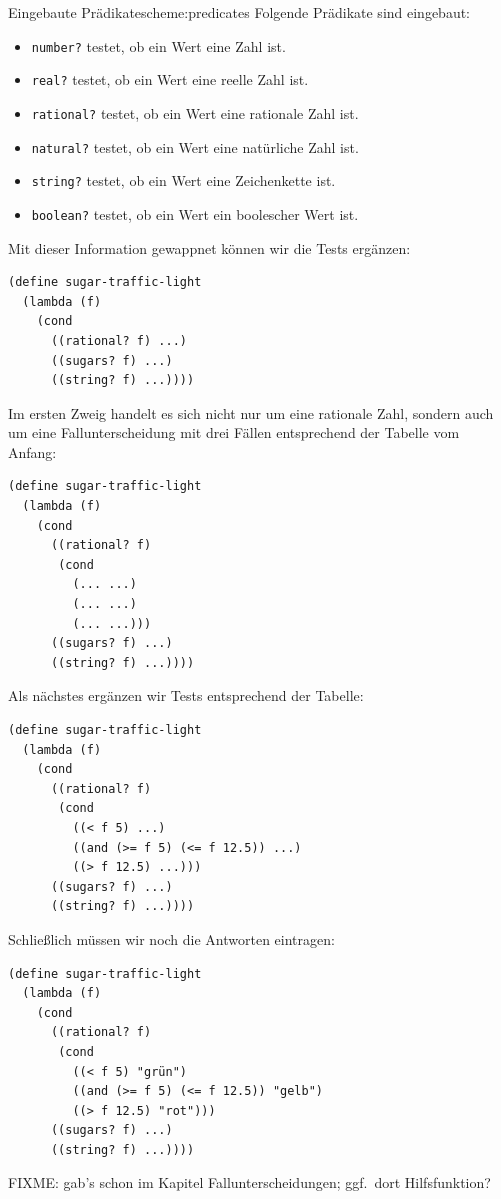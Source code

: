 \begin{feature}{Eingebaute Prädikate}{scheme:predicates}
  Folgende Prädikate sind eingebaut:
  \begin{itemize}
  \item \texttt{number?} testet, ob ein Wert eine Zahl ist.
  \item \texttt{real?} testet, ob ein Wert eine reelle Zahl ist.
  \item \texttt{rational?} testet, ob ein Wert eine rationale Zahl ist.
  \item \texttt{natural?} testet, ob ein Wert eine natürliche Zahl ist.
  \item \texttt{string?} testet, ob ein Wert eine Zeichenkette ist.
  \item \texttt{boolean?} testet, ob ein Wert ein boolescher Wert ist.
  \end{itemize}
\end{feature}
%
Mit dieser Information gewappnet können wir die Tests ergänzen:
%
\begin{verbatim}
(define sugar-traffic-light
  (lambda (f)
    (cond
      ((rational? f) ...)
      ((sugars? f) ...)
      ((string? f) ...))))
\end{verbatim}         
%
Im ersten Zweig handelt es sich nicht nur um eine rationale Zahl,
sondern auch um eine Fallunterscheidung mit drei Fällen entsprechend
der Tabelle vom Anfang:
%
\begin{verbatim}
(define sugar-traffic-light
  (lambda (f)
    (cond
      ((rational? f) 
       (cond
         (... ...)
         (... ...)
         (... ...)))
      ((sugars? f) ...)
      ((string? f) ...))))
\end{verbatim}         
%
Als nächstes ergänzen wir Tests entsprechend der Tabelle:
%
\begin{verbatim}
(define sugar-traffic-light
  (lambda (f)
    (cond
      ((rational? f) 
       (cond
         ((< f 5) ...)
         ((and (>= f 5) (<= f 12.5)) ...)
         ((> f 12.5) ...)))
      ((sugars? f) ...)
      ((string? f) ...))))
\end{verbatim}         
%
Schließlich müssen wir noch die Antworten eintragen:
%
\begin{verbatim}
(define sugar-traffic-light
  (lambda (f)
    (cond
      ((rational? f) 
       (cond
         ((< f 5) "grün")
         ((and (>= f 5) (<= f 12.5)) "gelb")
         ((> f 12.5) "rot")))
      ((sugars? f) ...)
      ((string? f) ...))))
\end{verbatim}         
%
FIXME: gab's schon im Kapitel Fallunterscheidungen; ggf.\ dort
Hilfsfunktion?


